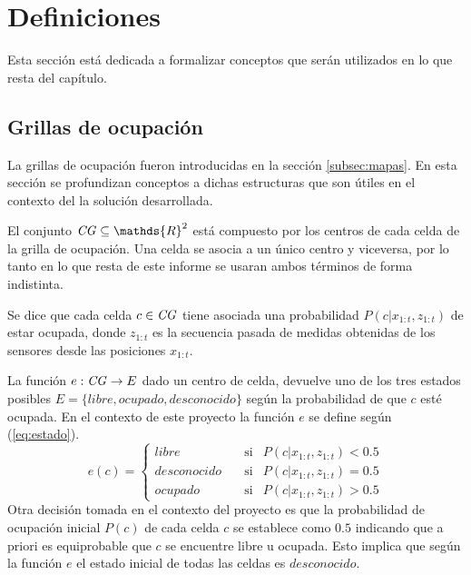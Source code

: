 \section{Definiciones} \label{sec:def}
Esta sección está dedicada a formalizar conceptos que serán utilizados en lo
que resta del capítulo.

\subsection{Grillas de ocupación}\label{subsec:Grilla}
La grillas de ocupación fueron introducidas en la sección \ref{subsec:mapas}.
En esta sección se profundizan conceptos a dichas estructuras que son útiles en
el contexto del la solución desarrollada.

El conjunto $\mli{CG}\subseteq \mathds{R}^2$ está compuesto por los centros de cada
celda de la grilla de ocupación. Una celda se asocia a un único centro y
viceversa, por lo tanto en lo que resta de este informe se usaran ambos
términos de forma indistinta.

Se dice que cada celda $c\in \mathit{CG}$ tiene asociada una probabilidad $P(c|x_{1:t},z_{1:t})$
de estar ocupada, donde $z_{1:t}$ es la secuencia pasada de medidas obtenidas de los
sensores desde las posiciones $x_{1:t}$.

La función $e : \mathit{CG} \rightarrow E$ dado un centro de celda, devuelve uno
de los tres estados posibles $E=\{libre, ocupado, desconocido\}$ según la
probabilidad de que $c$ esté ocupada. En el contexto de este proyecto la
función $e$ se define según
(\ref{eq:estado}).
\begin{equation} 
  e(c)= 
  \left \{ 
    \begin{aligned}
       libre       &\ \ \ \text{ si}& P(c|x_{1:t},z_{1:t}) < 0.5 \\
       desconocido &\ \ \ \text{ si}& P(c|x_{1:t},z_{1:t}) = 0.5 \\
       ocupado     &\ \ \ \text{ si}& P(c|x_{1:t},z_{1:t}) > 0.5
    \end{aligned}
  \right .
  \label{eq:estado}
\end{equation}
Otra decisión tomada en el contexto del proyecto es que la probabilidad de
ocupación inicial $P(c)$ de cada celda $c$ se establece como $0.5$ indicando
que a priori es equiprobable que $c$ se encuentre libre u ocupada. Esto implica
que según la función $e$ el estado inicial de todas las celdas es $desconocido$.

